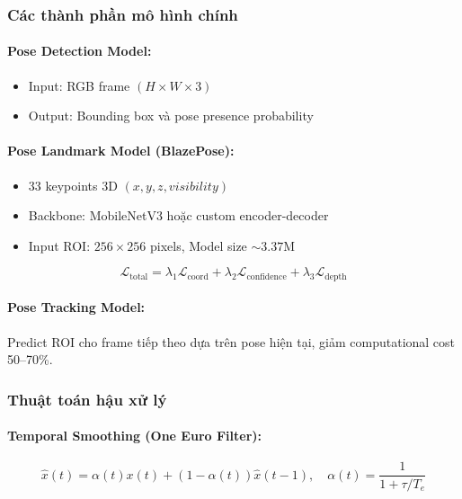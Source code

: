 \subsubsection{Các thành phần mô hình chính}

\paragraph{Pose Detection Model:}
\begin{itemize}
    \item Input: RGB frame $(H \times W \times 3)$
    \item Output: Bounding box và pose presence probability
\end{itemize}

\paragraph{Pose Landmark Model (BlazePose):}
\begin{itemize}
    \item 33 keypoints 3D $(x, y, z, visibility)$
    \item Backbone: MobileNetV3 hoặc custom encoder-decoder
    \item Input ROI: $256 \times 256$ pixels, Model size $\sim3.37$M
\end{itemize}

\begin{equation}
\mathcal{L}_{\text{total}} = \lambda_1 \mathcal{L}_{\text{coord}} + \lambda_2 \mathcal{L}_{\text{confidence}} + \lambda_3 \mathcal{L}_{\text{depth}}
\end{equation}

\paragraph{Pose Tracking Model:} Predict ROI cho frame tiếp theo dựa trên pose hiện tại, giảm computational cost 50–70\%.

\subsubsection{Thuật toán hậu xử lý}

\paragraph{Temporal Smoothing (One Euro Filter):}
\begin{equation}
\hat{x}(t) = \alpha(t) x(t) + (1-\alpha(t)) \hat{x}(t-1), \quad
\alpha(t) = \frac{1}{1 + \tau / T_e}
\end{equation}

